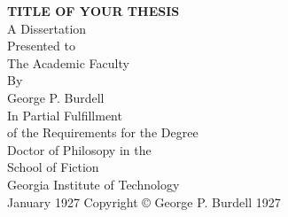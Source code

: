 
\newcommand{\thesisTitle}{Title of Your Thesis}
\newcommand{\yourName}{George P. Burdell}
\newcommand{\yourSchool}{Fiction}
\newcommand{\yourMonth}{January}
\newcommand{\yourYear}{1927}




\begin{titlepage}
\begin{center}

\begin{singlespacing}

\textbf{\MakeUppercase{\thesisTitle}}\\
\vspace{10\baselineskip}
A Dissertation\\
Presented to\\
The Academic Faculty\\
\vspace{3\baselineskip}
By\\
\vspace{3\baselineskip}
\yourName\\
\vspace{3\baselineskip}
In Partial Fulfillment\\
of the Requirements for the Degree\\
Doctor of Philosopy in the\\
School of \yourSchool\\
\vspace{3\baselineskip}
Georgia Institute of Technology\\
\vspace{\baselineskip}
\yourMonth{} \yourYear{}
\vfill
Copyright \copyright{} \yourName{} \yourYear{}

\end{singlespacing}

\end{center}
\end{titlepage}


